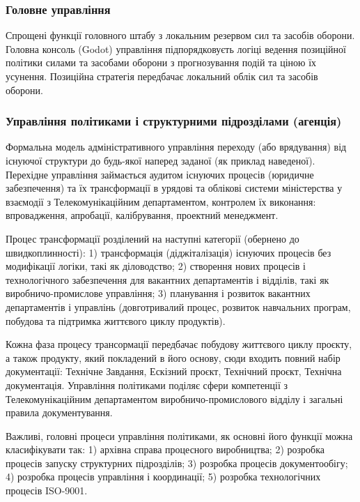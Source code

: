 \subsubsection{Головне управління}

Спрощені функції головного штабу з локальним резервом сил та засобів оборони. Головна консоль (Godot) управління підпорядковуєть логіці ведення позиційної політики силами та засобами оборони з прогнозування подій та ціною їх усунення. Позиційна стратегія передбачає локальний облік сил та засобів оборони.

\subsubsection{Управління політиками і структурними підрозділами (агенція)}

Формальна модель адміністративного управління переходу (або врядування) від існуючої структури до будь-якої наперед заданої (як приклад наведеної). Перехідне управління займається аудитом існуючих процесів (юридичне забезпечення) та їх трансформації в урядові та облікові системи міністерства у взаємодії з Телекомунікаційним департаментом, контролем їх виконання: впровадження, апробації, калібрування, проектний менеджмент.

Процес трансформації розділений на наступні категорії (обернено до швидкоплинності): 1) трансформація (діджіталізація) існуючих процесів без модифікації логіки, такі як діловодство; 2) створення нових процесів і технологічного забезпечення для вакантних департаментів і відділів, такі як виробничо-промислове управління; 3) планування і розвиток вакантних департаментів і управлінь (довготривалий процес, розвиток навчальних програм, побудова та підтримка життєвого циклу продуктів).

Кожна фаза процесу трансормації передбачає побудову життєвого циклу проєкту, а також продукту, який покладений в його основу, сюди входить повний набір документації: Технічне Завдання, Ескізний проєкт, Технічний проєкт, Технічна документація. Управління політиками поділяє сфери компетенції з Телекомунікаційним департаментом виробничо-промислового відділу і загальні правила документування.

Важливі, головні процеси управління політиками, як основні його функції можна класифікувати так: 1) архівна справа процесного виробництва; 2) розробка процесів запуску структурних підрозділів; 3) розробка процесів документообігу; 4) розробка процесів управління і координації; 5) розробка технологічних процесів ISO-9001.

